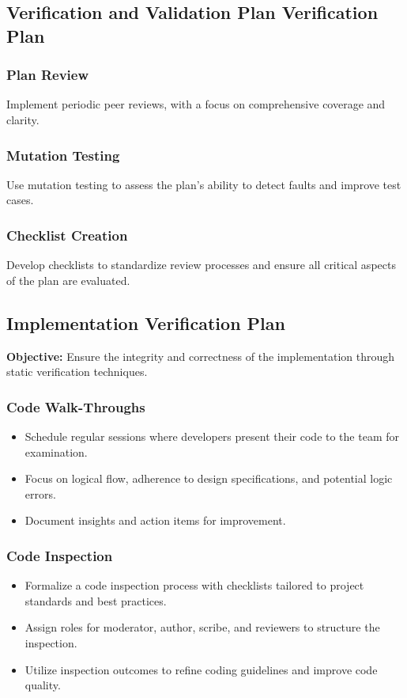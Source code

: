\documentclass[12pt, titlepage]{article}
\begin{document}
\subsection{Verification and Validation Plan Verification Plan}

\subsubsection{Plan Review}
Implement periodic peer reviews, with a focus on comprehensive coverage and clarity.

\subsubsection{Mutation Testing}
Use mutation testing to assess the plan's ability to detect faults and improve test cases.

\subsubsection{Checklist Creation}
Develop checklists to standardize review processes and ensure all critical aspects of the plan are evaluated.

\subsection{Implementation Verification Plan}

\noindent \textbf{Objective:} Ensure the integrity and correctness of the implementation through static verification techniques.

\subsubsection{Code Walk-Throughs}
\begin{itemize}
  \item Schedule regular sessions where developers present their code to the team for examination.
  \item Focus on logical flow, adherence to design specifications, and potential logic errors.
  \item Document insights and action items for improvement.
\end{itemize}

\subsubsection{Code Inspection}
\begin{itemize}
  \item Formalize a code inspection process with checklists tailored to project standards and best practices.
  \item Assign roles for moderator, author, scribe, and reviewers to structure the inspection.
  \item Utilize inspection outcomes to refine coding guidelines and improve code quality.
\end{itemize}
\end{document}
